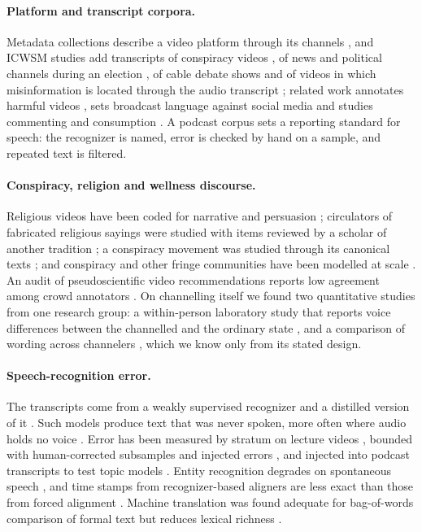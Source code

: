\documentclass[letterpaper]{article} %
\begin{document}
\paragraph{Platform and transcript corpora.} Metadata collections describe a video platform through its channels \cite{hortaribeiro2020youniverse}, and ICWSM studies add transcripts of conspiracy videos \cite{liaw2023younicon}, of news and political channels during an election \cite{sosnovik2025times}, of cable debate shows \cite{zaman2025disagreement} and of videos in which misinformation is located through the audio transcript \cite{matos2026misinformation}; related work annotates harmful videos \cite{jo2025metaharm}, sets broadcast language against social media \cite{ding2023same} and studies commenting and consumption \cite{wu2021crosspartisan,chandio2026examining}. A podcast corpus \cite{litterer2024mapping} sets a reporting standard for speech: the recognizer is named, error is checked by hand on a sample, and repeated text is filtered.

\paragraph{Conspiracy, religion and wellness discourse.} Religious videos have been coded for narrative and persuasion \cite{chen2025digital}; circulators of fabricated religious sayings were studied with items reviewed by a scholar of another tradition \cite{fawzi2025fabricating}; a conspiracy movement was studied through its canonical texts \cite{papasavva2021gospel}; and conspiracy and other fringe communities have been modelled at scale \cite{samory2018government,attanasio2025effects,sharma2021characterizing,hortaribeiro2020evolution}. An audit of pseudoscientific video recommendations reports low agreement among crowd annotators \cite{papadamou2020flu}. On channelling itself we found two quantitative studies from one research group: a within-person laboratory study that reports voice differences between the channelled and the ordinary state \cite{wahbeh2019physiological}, and a comparison of wording across channelers \cite{wahbeh2026semantic}, which we know only from its stated design.

\paragraph{Speech-recognition error.} The transcripts come from a weakly supervised recognizer \cite{radford2022robust} and a distilled version of it \cite{gandhi2023distilwhisper}. Such models produce text that was never spoken, more often where audio holds no voice \cite{koenecke2024careless,baranski2025investigation}. Error has been measured by stratum on lecture videos \cite{rai2023deep}, bounded with human-corrected subsamples and injected errors \cite{proksch2019testing}, and injected into podcast transcripts to test topic models \cite{fetic2021topic}. Entity recognition degrades on spontaneous speech \cite{szymanski2023ner}, and time stamps from recognizer-based aligners are less exact than those from forced alignment \cite{rousso2024tradition}. Machine translation was found adequate for bag-of-words comparison of formal text \cite{devries2018longer} but reduces lexical richness \cite{vanmassenhove2021machine}.
\end{document}
